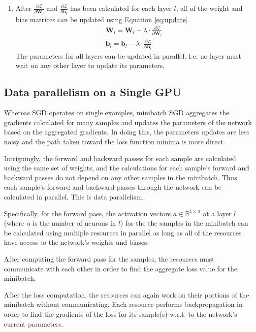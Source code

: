 \documentclass[11pt,a4paper]{article}
\begin{document}
\begin{enumerate}
    \item After $\frac{\partial \mathcal{L}}{\partial \bm{W}_l}$ and $\frac{\partial \mathcal{L}}{\partial \bm{b}_l}$ has been calculated for each layer $l$, all of the weight and bias matrices can be updated using Equation \ref{eq:update}.
    \begin{equation} \label{eq:update}
    \begin{split}
        \bm{W}_l = \bm{W}_l - \lambda \cdot \frac{\partial \mathcal{L}}{\partial \bm{W}_l} \\
        \bm{b}_l = \bm{b}_l - \lambda \cdot \frac{\partial \mathcal{L}}{\partial \bm{b}_l}
    \end{split}
    \end{equation}
    The parameters for all layers can be updated in parallel. I.e. no layer must wait on any other layer to update its parameters.
\end{enumerate}
\subsection{Data parallelism on a Single GPU}
Whereas SGD operates on single examples, minibatch SGD aggregates the gradients calculated for many samples and updates the parameters of the network based on the aggregated gradients. In doing this, the parameters updates are less noisy and the path taken toward the loss function minima is more direct.

Intriguingly, the forward and backward passes for each sample are calculated using the same set of weights, and the calculations for each sample's forward and backward passes do not depend on any other samples in the minibatch. Thus each sample's forward and backward passes through the network can be calculated in parallel. This is data parallelism. 

Specifically, for the forward pass, the activation vectors $a \in \mathbb{R}^{1\times u}$ at a layer $l$ (where $u$ is the number of neurons in $l$) for the the samples in the minibatch can be calculated using multiple resources in parallel as long as all of the resources have access to the network's weights and biases.

After computing the forward pass for the samples, the resources must communicate with each other in order to find the aggregate loss value for the minibatch.

After the loss computation, the resources can again work on their portions of the minibatch without communicating. Each resource performs backpropagation in order to find the gradients of the loss for its sample(s) w.r.t. to the network's current parameters.
\end{document}
